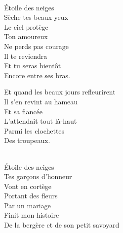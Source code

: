 \documentclass{novel}
\begin{document}
\begin{multicols}{2}
\begin{bfseries}
[Refrain 3:] \\
Étoile des neiges \\
Sèche tes beaux yeux \\
Le ciel protège \\
Ton amoureux \\
Ne perds pas courage \\
Il te reviendra \\
Et tu seras bientôt \\
Encore entre ses bras. \\
\end{bfseries}

Et quand les beaux jours refleurirent \\
Il s'en revint au hameau \\
Et sa fiancée \\
L'attendait tout là-haut \\
Parmi les clochettes \\
Des troupeaux. \\

\begin{bfseries}
[Refrain 4:] \\
Étoile des neiges \\
Tes garçons d'honneur \\
Vont en cortège \\
Portant des fleurs \\
Par un mariage \\
Finit mon histoire \\
De la bergère et de son petit savoyard \\
\end{bfseries}
\end{multicols}

\newpage
\normalsize
\end{document}
